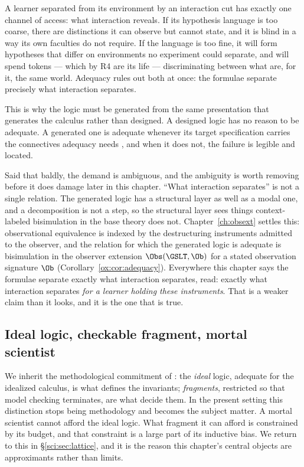 A learner separated from its environment by an interaction cut has exactly one channel of access: what
interaction reveals. If its hypothesis language is too coarse, there are distinctions it can observe
but cannot state, and it is blind in a way its own faculties do not require. If the language is too
fine, it will form hypotheses that differ on environments no experiment could separate, and will spend
tokens --- which by R4 are its life --- discriminating between what are, for it, the same world.
Adequacy rules out both at once: the formulae separate precisely what interaction separates.

This is why the logic must be generated from the same presentation that generates the calculus rather
than designed. A designed logic has no reason to be adequate. A generated one is adequate whenever its
target specification carries the connectives adequacy needs \cite[\S1.3]{ClassifierNote}, and when it
does not, the failure is legible and located.

\begin{remark}
\label{sci:rem:adequacy-index}
Said that baldly, the demand is ambiguous, and the ambiguity is worth removing before it does damage
later in this chapter. ``What interaction separates'' is not a single relation. The generated logic has
a structural layer as well as a modal one, and a decomposition is not a step, so the structural layer
sees things context-labeled bisimulation in the base theory does not. Chapter~\ref{ch:obsext} settles
this: observational equivalence is indexed by the destructuring instruments admitted to the observer,
and the relation for which the generated logic is adequate is bisimulation in the observer extension
$\Obs(\GSLT,\Ob)$ for a stated observation signature $\Ob$
(Corollary~\ref{ox:cor:adequacy}). Everywhere this chapter says the formulae separate exactly what
interaction separates, read: exactly what interaction separates \emph{for a learner holding these
instruments}. That is a weaker claim than it looks, and it is the one that is true.
\end{remark}

\subsection{Ideal logic, checkable fragment, mortal scientist}\label{sci:S1.6}

We inherit the methodological commitment of \cite{ClassifierNote}: the \emph{ideal} logic, adequate
for the idealized calculus, is what defines the invariants; \emph{fragments}, restricted so that model
checking terminates, are what decide them. In the present setting this distinction stops being
methodology and becomes the subject matter. A mortal scientist cannot afford the ideal logic. What
fragment it can afford is constrained by its budget, and that constraint is a large part of its
inductive bias. We return to this in \S\ref{sci:sec:lattice}, and it is the reason this chapter's
central objects are approximants rather than limits.

